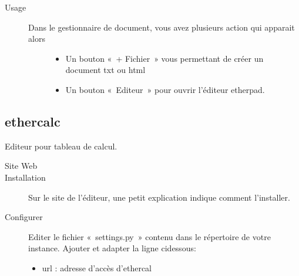 \documentclass[letterpaper,10pt,french]{sphinxmanual}
\begin{document}
\begin{sphinxVerbatim}[commandchars=\\\{\}]
     
\end{sphinxVerbatim}
\begin{description}
\item[{Usage}] \leavevmode\begin{description}
\item[{Dans le gestionnaire de document, vous avez plusieurs action qui apparait alors}] \leavevmode\begin{itemize}
\item {} 
Un bouton « + Fichier » vous permettant de créer un document txt ou html

\item {} 
Un bouton « Editeur » pour ouvrir l’éditeur etherpad.

\end{itemize}

\end{description}

\end{description}

\noindent{}


\subsection{ethercalc}
\label{\detokenize{documents/editor:ethercalc}}
Editeur pour tableau de calcul.
\begin{description}
\item[{Site Web}] \leavevmode
{}

\item[{Installation}] \leavevmode
Sur le site de l’éditeur, une petit explication indique comment l’installer.

\item[{Configurer}] \leavevmode
Editer le fichier « settings.py » contenu dans le répertoire de votre instance.
Ajouter et adapter la ligne ci\sphinxhyphen{}dessous:
\begin{itemize}
\item {} 
url : adresse d’accès d’ethercal

\end{itemize}

\end{description}
\end{document}
